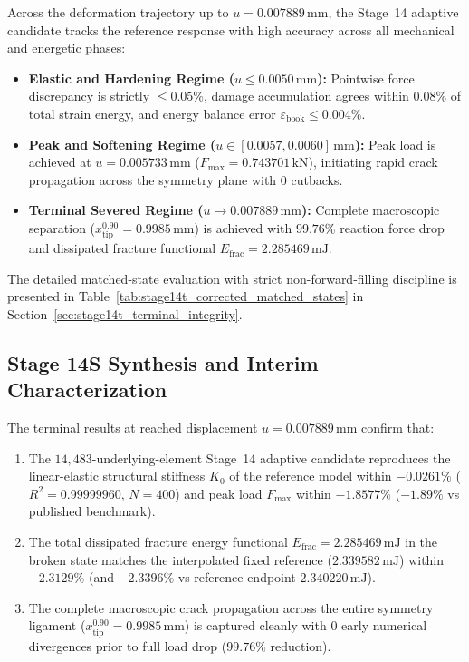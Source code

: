 Across the deformation trajectory up to $u = 0.007889\,\mathrm{mm}$, the Stage~14 adaptive candidate tracks the reference response with high accuracy across all mechanical and energetic phases:
\begin{itemize}
    \item \textbf{Elastic and Hardening Regime ($u \le 0.0050\,\mathrm{mm}$):} Pointwise force discrepancy is strictly $\le 0.05\%$, damage accumulation agrees within $0.08\%$ of total strain energy, and energy balance error $\varepsilon_{\mathrm{book}} \le 0.004\%$.
    \item \textbf{Peak and Softening Regime ($u \in [0.0057, 0.0060]\,\mathrm{mm}$):} Peak load is achieved at $u = 0.005733\,\mathrm{mm}$ ($F_{\max} = 0.743701\,\mathrm{kN}$), initiating rapid crack propagation across the symmetry plane with $0$ cutbacks.
    \item \textbf{Terminal Severed Regime ($u \to 0.007889\,\mathrm{mm}$):} Complete macroscopic separation ($x_{\mathrm{tip}}^{0.90} = 0.9985\,\mathrm{mm}$) is achieved with $99.76\%$ reaction force drop and dissipated fracture functional $E_{\mathrm{frac}} = 2.285469\,\mathrm{mJ}$.
\end{itemize}
The detailed matched-state evaluation with strict non-forward-filling discipline is presented in Table~\ref{tab:stage14t_corrected_matched_states} in Section~\ref{sec:stage14t_terminal_integrity}.

\subsection{Stage 14S Synthesis and Interim Characterization}
\label{subsec:stage14s_conclusions}

The terminal results at reached displacement $u = 0.007889\,\mathrm{mm}$ confirm that:
\begin{enumerate}
    \item The $14,483$-underlying-element Stage~14 adaptive candidate reproduces the linear-elastic structural stiffness $K_0$ of the reference model within $\mathbf{-0.0261\%}$ ($R^2 = 0.99999960$, $N=400$) and peak load $F_{\max}$ within $\mathbf{-1.8577\%}$ ($-1.89\%$ vs published benchmark).
    \item The total dissipated fracture energy functional $E_{\mathrm{frac}} = 2.285469\,\mathrm{mJ}$ in the broken state matches the interpolated fixed reference ($2.339582\,\mathrm{mJ}$) within $\mathbf{-2.3129\%}$ (and $-2.3396\%$ vs reference endpoint $2.340220\,\mathrm{mJ}$).
    \item The complete macroscopic crack propagation across the entire symmetry ligament ($x_{\mathrm{tip}}^{0.90} = 0.9985\,\mathrm{mm}$) is captured cleanly with $0$ early numerical divergences prior to full load drop ($99.76\%$ reduction).
\end{enumerate}

